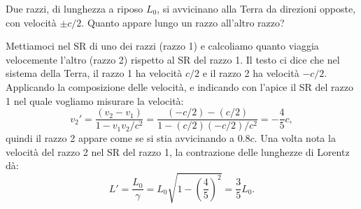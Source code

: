 \documentclass{article}
\begin{document}
\begin{Exercise}[title={Composizione relativistica delle velocit\`a e contrazione delle lunghezze}]
  Due razzi, di lunghezza a riposo $L_0$, si avvicinano alla Terra da direzioni opposte, con velocit\`a $\pm c/2$. Quanto appare lungo un razzo all'altro razzo?
\end{Exercise}
\begin{Answer}
  Mettiamoci nel SR di uno dei razzi (razzo 1) e calcoliamo quanto
  viaggia velocemente l'altro (razzo 2) rispetto al SR del razzo 1.
  Il testo ci dice che nel sistema della Terra, il razzo 1 ha
  velocit\`a $c/2$ e il razzo 2 ha velocit\`a $-c/2$. Applicando la
  composizione delle velocit\`a, e indicando con l'apice il SR del razzo 1 nel quale vogliamo misurare la velocit\`a:
  \begin{equation*}
    v_2' = \frac{(v_2-v_1)}{1-v_1v_2/c^2} = \frac{(-c/2)-(c/2)}{1-(c/2)(-c/2)/c^2} = -\frac{4}{5}c,
  \end{equation*}
  quindi il razzo 2 appare come se si stia avvicinando a $0.8c$. Una volta nota la velocit\`a del razzo 2 nel SR del razzo 1, la
  contrazione delle lunghezze di Lorentz d\`a:
  \begin{equation*}
    L' = \frac{L_0}{\gamma} = L_0\sqrt{1-\left(\frac{4}{5}\right)^2} = \frac{3}{5}L_0.
  \end{equation*}
\end{Answer}
\end{document}
